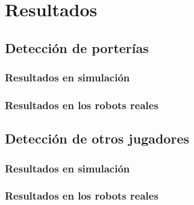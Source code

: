 \chapter{Resultados}
\section{Detección de porterías}
    \subsection{Resultados en simulación}
    
    \subsection{Resultados en los robots reales}
\section{Detección de otros jugadores}
    \subsection{Resultados en simulación}
    \subsection{Resultados en los robots reales}
